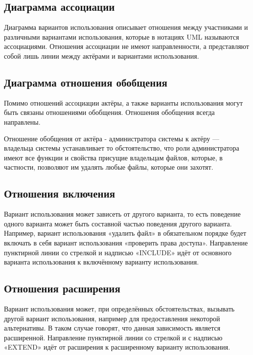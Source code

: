 \subsection{Диаграмма ассоциации}

Диаграмма вариантов использования описывает отношения между участниками и различными вариантами использования, которые в нотациях UML называются ассоциациями. Отношения ассоциации не имеют направленности, а представляют собой лишь линии между актёрами и вариантами использования.

\subsection{Диаграмма отношения обобщения}

Помимо отношений ассоциации актёры, а также варианты использования могут быть связаны отношениями обобщения. Отношения обобщения всегда направлены. 

Отношение обобщения от актёра - администратора системы к актёру --- владельца системы устанавливает то обстоятельство, что роли администратора имеют все функции и свойства присущие владельцам файлов, которые, в частности, позволяют им удалять любые файлы, которые они захотят.

\subsection{Отношения включения}

Вариант использования может зависеть от другого варианта, то есть поведение одного варианта может быть составной частью поведения другого варианта. Например, вариант использования «удалить файл» в обязательном порядке будет включать в себя вариант использования «проверить права доступа». Направление пунктирной линии со стрелкой и надписью «INCLUDE» идёт от основного варианта использования к включённому варианту использования.

\subsection{Отношения расширения}

Вариант использования может, при определённых обстоятельствах, вызывать другой вариант использования, например для предоставления некоторой альтернативы. В таком случае говорят, что данная зависимость является расширенной. Направление пунктирной линии со стрелкой и с надписью «EXTEND» идёт от расширения к расширенному варианту использования. 

